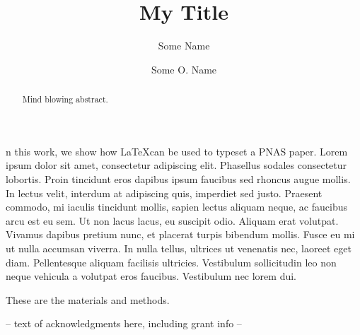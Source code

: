 \documentclass{pnastwo}
\begin{document}
\title{My Title}
\author{Some Name  \and 
Some O. Name}
\maketitle
\begin{article}
\begin{abstract}
Mind blowing abstract.
\end{abstract}

n this work, we show how \LaTeX can be used to typeset a PNAS paper. Lorem ipsum dolor sit amet, consectetur adipiscing elit. Phasellus sodales consectetur lobortis. Proin tincidunt eros dapibus ipsum faucibus sed rhoncus augue mollis. In lectus velit, interdum at adipiscing quis, imperdiet sed justo. Praesent commodo, mi iaculis tincidunt mollis, sapien lectus aliquam neque, ac faucibus arcu est eu sem. Ut non lacus lacus, eu suscipit odio. Aliquam erat volutpat. Vivamus dapibus pretium nunc, et placerat turpis bibendum mollis. Fusce eu mi ut nulla accumsan viverra. In nulla tellus, ultrices ut venenatis nec, laoreet eget diam. Pellentesque aliquam facilisis ultricies. Vestibulum sollicitudin leo non neque vehicula a volutpat eros faucibus. Vestibulum nec lorem dui.

\begin{materials}
These are the materials and methods.
\end{materials}

\begin{acknowledgments}
-- text of acknowledgments here, including grant info --
\end{acknowledgments}

\end{article}
\end{document}
